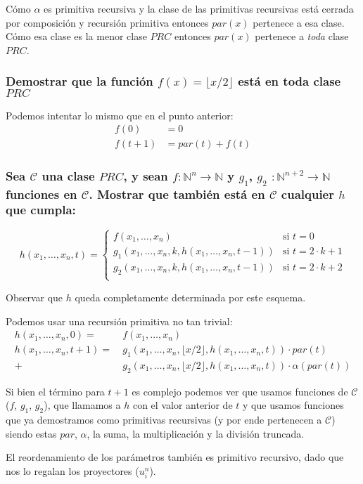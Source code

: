 \documentclass[fleqn, 11pt]{article}
\newcommand{\nat}{\mathbb{N}}
\newcommand{\Ccur}{\mathcal{C}}
\begin{document}
Cómo $\alpha$ es primitiva recursiva y la clase de las primitivas recursivas
está cerrada por composición y recursión primitiva entonces $par(x)$ pertenece
a esa clase. Cómo esa clase es la menor clase $PRC$ entonces $par(x)$ pertenece
a \emph{toda} clase $PRC$.

\subsubsection{Demostrar que la función $f(x) = \lfloor x / 2 \rfloor$ está en
toda clase $PRC$}

Podemos intentar lo mismo que en el punto anterior:
\begin{align*}
	f(0)     &= 0 \\
	f(t + 1) &= par(t) + f(t)
\end{align*}

\subsubsection{Sea $\Ccur$ una clase $PRC$, y sean $f: \nat^n \to \nat$ y
$g_1$, $g_2$ $: \nat^{n+2} \to \nat$ funciones en $\Ccur$. Mostrar que también
está en $\Ccur$ cualquier $h$ que cumpla:}

\[
	h(x_1, \dots, x_n, t) =
	\begin{cases}
		f(x_1, \dots, x_n)
			& \text{si } t = 0 \\
		g_1(x_1, \dots, x_n, k, h(x_1, \dots, x_n, t - 1))
			& \text{si } t = 2 \cdot k + 1 \\
		g_2(x_1, \dots, x_n, k, h(x_1, \dots, x_n, t - 1))
			& \text{si } t = 2 \cdot k + 2 \\
	\end{cases}
\]

Observar que $h$ queda completamente determinada por este esquema.

Podemos usar una recursión primitiva no tan trivial:
\begin{align*}
	h(x_1, \dots, x_n, 0)
		=&\ f(x_1, \dots, x_n) \\
	h(x_1, \dots, x_n, t + 1)
		=&\ g_1(x_1, \dots, x_n, \lfloor x / 2 \rfloor,
		    h(x_1, \dots, x_n, t)) \cdot par(t) \\
		+&\ g_2(x_1, \dots, x_n, \lfloor x / 2 \rfloor,
		    h(x_1, \dots, x_n, t)) \cdot \alpha(par(t))
\end{align*}

Si bien el término para $t + 1$ es complejo podemos ver que usamos funciones de
$\Ccur$ ($f$, $g_1$, $g_2$), que llamamos a $h$ con el valor anterior de $t$ y
que usamos funciones que ya demostramos como primitivas recursivas (y por ende
pertenecen a $\Ccur$) siendo estas $par$, $\alpha$, la suma, la multiplicación
y la división truncada.

El reordenamiento de los parámetros también es primitivo recursivo, dado que
nos lo regalan los proyectores ($u^n_i$).
\end{document}
